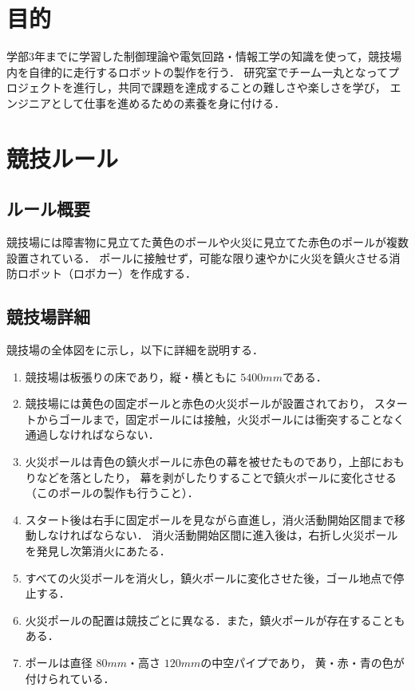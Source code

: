 \documentclass[11pt,a4]{jsarticle}
\begin{document}
  

\newpage
\section{目的} 

  学部3年までに学習した制御理論や電気回路・情報工学の知識を使って，競技場内を自律的に走行するロボットの製作を行う．
  研究室でチーム一丸となってプロジェクトを進行し，共同で課題を達成することの難しさや楽しさを学び，
  エンジニアとして仕事を進めるための素養を身に付ける．

\section{競技ルール} 

  \subsection{ルール概要}
    競技場には障害物に見立てた黄色のポールや火災に見立てた赤色のポールが複数設置されている．
    ポールに接触せず，可能な限り速やかに火災を鎮火させる消防ロボット（ロボカー）を作成する．

  \subsection{競技場詳細}
    競技場の全体図をに示し，以下に詳細を説明する．

    \begin{enumerate}
      \item 競技場は板張りの床であり，縦・横ともに $5400\unit{mm}$である．
      \item 競技場には黄色の固定ポールと赤色の火災ポールが設置されており，
            スタートからゴールまで，固定ポールには接触，火災ポールには衝突することなく通過しなければならない．
      \item 火災ポールは青色の鎮火ポールに赤色の幕を被せたものであり，上部におもりなどを落としたり，
            幕を剥がしたりすることで鎮火ポールに変化させる（このポールの製作も行うこと）．
      \item スタート後は右手に固定ポールを見ながら直進し，消火活動開始区間まで移動しなければならない．
            消火活動開始区間に進入後は，右折し火災ポールを発見し次第消火にあたる．
      \item すべての火災ポールを消火し，鎮火ポールに変化させた後，ゴール地点で停止する．
      \item 火災ポールの配置は競技ごとに異なる．また，鎮火ポールが存在することもある．
      \item ポールは直径 $80\unit{mm}$・高さ $120\unit{mm}$の中空パイプであり，
            黄・赤・青の色が付けられている．
    \end{enumerate}
\end{document}
